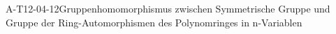 
\begin{LEM}{A-T12-04-12}{Gruppenhomomorphismus zwischen Symmetrische Gruppe und Gruppe der Ring-Automorphismen des Polynomringes in n-Variablen}
\end{LEM}
